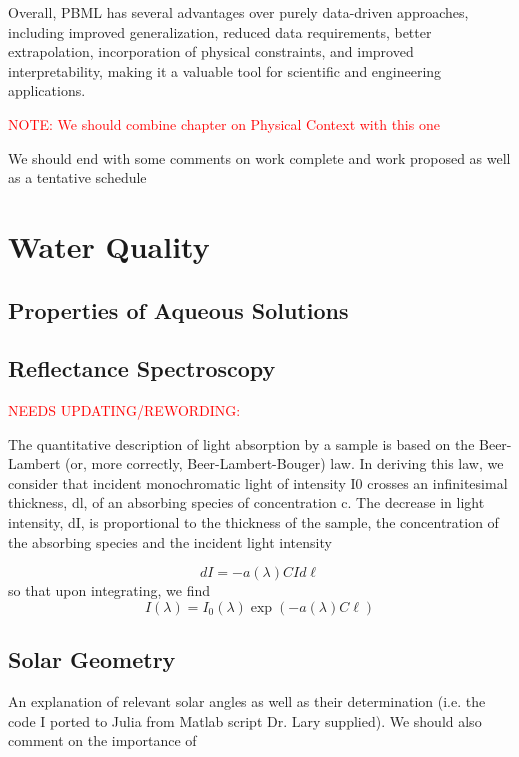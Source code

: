 Overall, PBML has several advantages over purely data-driven approaches, including improved generalization, reduced data requirements, better extrapolation, incorporation of physical constraints, and improved interpretability, making it a valuable tool for scientific and engineering applications.



\textcolor{red}{NOTE: We should combine chapter on Physical Context with this one}

We should end with some comments on work complete and work proposed as well as a tentative schedule




\section{Water Quality}

\subsection{Properties of Aqueous Solutions}
\subsection{Reflectance Spectroscopy}

\textcolor{red}{NEEDS UPDATING/REWORDING:}

The quantitative description of light absorption by a sample is based on the Beer-Lambert (or, more correctly, Beer-Lambert-Bouger) law. In deriving this law, we consider that incident monochromatic light of intensity I0 crosses an infinitesimal thickness, dl, of an absorbing species of concentration c. The decrease in light intensity, dI, is proportional to the thickness of the sample, the concentration of the absorbing species and the incident light intensity

\begin{equation}
dI = -a(\lambda)CI d\ell
\end{equation}
so that upon integrating, we find
\begin{equation}
  I(\lambda) = I_0(\lambda)\exp(-a(\lambda)C\ell)
\end{equation}


\subsection{Solar Geometry}

An explanation of relevant solar angles as well as their determination (i.e. the code I ported to Julia from Matlab script Dr. Lary supplied). We should also comment on the importance of

